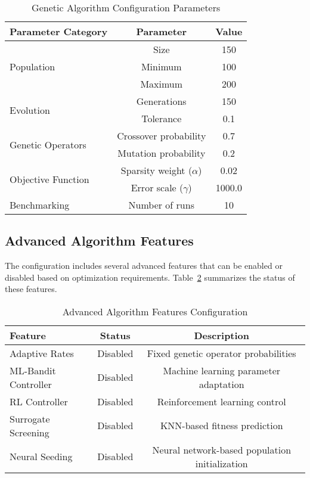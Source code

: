 \documentclass[12pt,a4paper]{article}
\begin{document}
\begin{table}[h!]
\centering
\caption{Genetic Algorithm Configuration Parameters}
\label{Tab:ga_settings}
\begin{tabular}{lcc}
\toprule
\textbf{Parameter Category} & \textbf{Parameter} & \textbf{Value} \\
\midrule
\multirow{3}{*}{Population} & Size & 150 \\
& Minimum & 100 \\
& Maximum & 200 \\
\midrule
\multirow{2}{*}{Evolution} & Generations & 150 \\
& Tolerance & 0.1 \\
\midrule
\multirow{2}{*}{Genetic Operators} & Crossover probability & 0.7 \\
& Mutation probability & 0.2 \\
\midrule
\multirow{2}{*}{Objective Function} & Sparsity weight ($\alpha$) & 0.02 \\
& Error scale ($\gamma$) & 1000.0 \\
\midrule
Benchmarking & Number of runs & 10 \\
\bottomrule
\end{tabular}
\end{table}

\subsection{Advanced Algorithm Features}

The configuration includes several advanced features that can be enabled or disabled based on optimization requirements. Table~\ref{Tab:advanced_features} summarizes the status of these features.

\begin{table}[h!]
\centering
\caption{Advanced Algorithm Features Configuration}
\label{Tab:advanced_features}
\begin{tabular}{lcc}
\toprule
\textbf{Feature} & \textbf{Status} & \textbf{Description} \\
\midrule
Adaptive Rates & Disabled & Fixed genetic operator probabilities \\
ML-Bandit Controller & Disabled & Machine learning parameter adaptation \\
RL Controller & Disabled & Reinforcement learning control \\
Surrogate Screening & Disabled & KNN-based fitness prediction \\
Neural Seeding & Disabled & Neural network-based population initialization \\
\bottomrule
\end{tabular}
\end{table}
\end{document}
